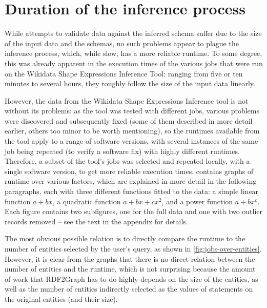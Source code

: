 

\section{Duration of the inference process}
\label{sec:Evaluation:duration}

While attempts to validate data against the inferred schema
suffer due to the size of the input data and the schemas,
no such problems appear to plague the inference process,
which, while slow, has a more reliable runtime.
To some degree, this was already apparent in the execution times
of the various jobs that were run on the Wikidata Shape Expressions Inference Tool:
ranging from five or ten minutes to several hours,
they roughly follow the size of the input data linearly.

However, the data from the Wikidata Shape Expressions Inference tool
is not without its problems:
as the tool was tested with different jobs,
various problems were discovered and subsequently fixed
(some of them described in more detail earlier, others too minor to be worth mentioning),
so the runtimes available from the tool apply to a range of software versions,
with several instances of the same job being repeated (to verify a software fix)
with highly different runtimes.
Therefore, a subset of the tool’s jobs was selected
and repeated locally, with a single software version,
to get more reliable execution times.
 contains graphs of runtime over various factors,
which are explained in more detail in the following paragraphs,
each with three different functions fitted to the data:
a simple linear function $a+bx$,
a quadratic function $a+bx+cx^2$,
and a power function $a+bx^c$.
Each figure contains two subfigures,
one for the full data and one with two outlier records removed –
see the text in the appendix for details.

The most obvious possible relation is
to directly compare the runtime to the number of entities selected by the user’s query,
as shown in \cref{fig:jobs-over-entities}.
However, it is clear from the graphs that there is no direct relation
between the number of entities and the runtime,
which is not surprising because the amount of work that RDF2Graph has to do
highly depends on the size of the entities,
as well as the number of entities indirectly selected as the values of statements on the original entities (and their size).

